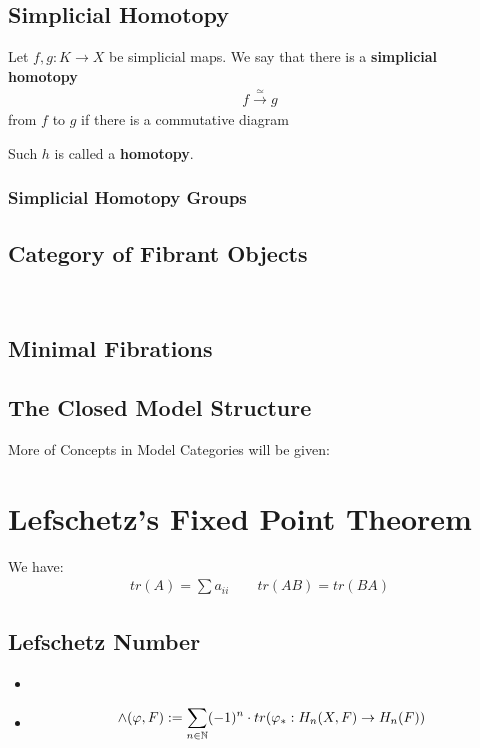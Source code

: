 \documentclass[Total.tex]{subfiles}
\begin{document}
			\subsection{Simplicial Homotopy}
				\begin{Def}
					Let $f,g:K\rightarrow X$ be simplicial maps. We say that there is a \textbf{simplicial homotopy}
					\begin{gather*}
						f\stackrel{\simeq}{\rightarrow} g
					\end{gather*}
					from $f$ to $g$ if there is a commutative diagram
					\begin{center}
					\end{center}
					Such $h$ is called a \textbf{homotopy}.
				\end{Def}
				\subsubsection{Simplicial Homotopy Groups}
			\subsection{Category of Fibrant Objects}\
			\subsection{Minimal Fibrations}
			\subsection{The Closed Model Structure}
			More of Concepts in Model Categories will be given: 
		\section{Lefschetz's Fixed Point Theorem}
			We have:
			\begin{gather*}
				tr(A)=\sum a_{ii}\qquad tr(AB)=tr(BA)
			\end{gather*}
			
			\subsection{Lefschetz Number}
				\begin{Def}
					\begin{itemize}
						\item 
						\item \begin{gather*}
							\wedge(\varphi,F):=\sum_{n\in \mathbb{N}} (-1)^n\cdot tr(\varphi_*:H_n(X,F)\rightarrow H_n(F))
						\end{gather*}
					\end{itemize}
				\end{Def}
\end{document}
